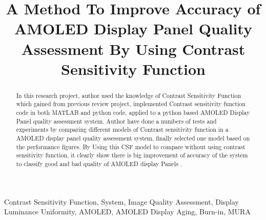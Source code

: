 \documentclass{article}
\title{A Method To Improve Accuracy of AMOLED Display Panel Quality Assessment By Using Contrast Sensitivity Function}
\begin{document}
\maketitle{}
%
\begin{abstract}
%
In this research project, author used the knowledge of Contrast Sensitivity Function which gained from previous review project, implemented Contrast sensitivity function code in both MATLAB and python code, applied to a python based AMOLED Display Panel quality assessment system. Author have done a numbers of tests and experiments by comparing different models of Contrast sensitivity function in a AMOLED display panel quality assessment system, finally selected one model based on the performance figures. By Using this CSF model to compare without using contrast sensitivity function, it clearly show there is big improvement of accuracy of the system to classify good and bad quality of AMOLED display Panels .   
\end{abstract}

\begin{keywords}
Contrast Sensitivity Function, System, Image Quality Assessment, Display Luminance Uniformity, AMOLED, AMOLED Display Aging, Burn-in, MURA
\end{keywords}
%
\end{document}
